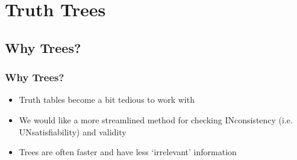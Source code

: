 ﻿%

\setcounter{section}{3}
\section{Truth Trees}

\begin{frame}

\scriptsize{\tableofcontents}

\end{frame}

\subsection{Why Trees?}

\begin{frame}
\frametitle{Why Trees?}

\begin{itemize}[<+->]

\item Truth tables become a bit tedious to work with

\item We would like a more streamlined method for checking INconsistency (i.e. UNsatisfiability) and validity

\item Trees are often faster and have less `irrelevant' information


\end{itemize}
\end{frame}

